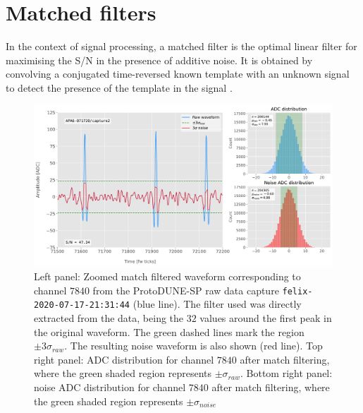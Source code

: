 \section{Matched filters}
\label{sec:matched_filter_matched_filter}

In the context of signal processing, a matched filter is the optimal linear filter for maximising the S/N in the presence of additive noise. It is obtained by convolving a conjugated time-reversed known template with an unknown signal to detect the presence of the template in the signal \cite{Turin1960}.

\begin{figure}[t]
	\centering
	\includegraphics[width=1\linewidth]{Images/Matched_Filter/waveform_example_mf}
	\caption[Example matched filtered waveform from a ProtoDUNE-SP raw data capture.]{Left panel: Zoomed match filtered waveform corresponding to channel $7840$ from the ProtoDUNE-SP raw data capture \texttt{felix-2020-07-17-21:31:44} (blue line). The filter used was directly extracted from the data, being the $32$ values around the first peak in the original waveform. The green dashed lines mark the region $\pm3\sigma_{raw}$. The resulting noise waveform is also shown (red line). Top right panel: ADC distribution for channel $7840$ after match filtering, where the green shaded region represents $\pm \sigma_{raw}$. Bottom right panel: noise ADC distribution for channel $7840$ after match filtering, where the green shaded region represents $\pm \sigma_{noise}$}
	\label{fig:adcs_mf}
\end{figure}

